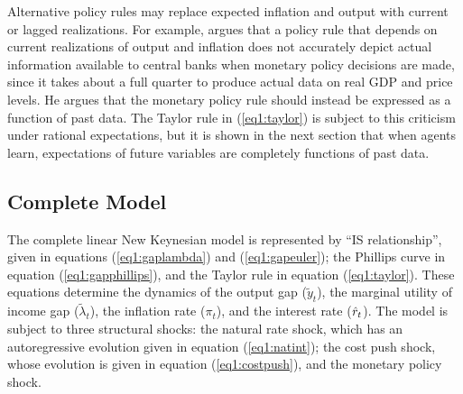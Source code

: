 Alternative policy rules may replace expected inflation and output with current or lagged realizations.  For example,  argues that a policy rule that depends on current realizations of output and inflation does not accurately depict actual information available to central banks when monetary policy decisions are made, since it takes about a full quarter to produce actual data on real GDP and price levels.  He argues that the monetary policy rule should instead be expressed as a function of past data.  The Taylor rule in (\ref{eq1:taylor}) is subject to this criticism under rational expectations, but it is shown in the next section that when agents learn, expectations of future variables are completely functions of past data.

\subsection{Complete Model}
The complete linear New Keynesian model is represented by ``IS relationship'', given in equations (\ref{eq1:gaplambda}) and (\ref{eq1:gapeuler}); the Phillips curve in equation (\ref{eq1:gapphillips}), and the Taylor rule in equation (\ref{eq1:taylor}).  These equations determine the dynamics of the output gap ($\tilde{y}_t$), the marginal utility of income gap ($\tilde{\lambda}_t$), the inflation rate ($\pi_t$), and the interest rate ($\hat{r}_t$).  The model is subject to three structural shocks: the natural rate shock, which has an autoregressive evolution given in equation (\ref{eq1:natint}); the cost push shock, whose evolution is given in equation (\ref{eq1:costpush}), and the monetary policy shock.

